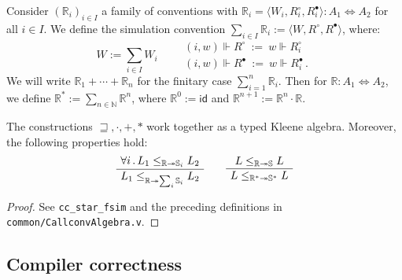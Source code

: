 \documentclass[acmsmall,screen,review,anonymous]{acmart}
\newcommand{\kw}[1]{\ensuremath{ \mathsf{#1} }}
\newcommand{\que}{\circ}
\newcommand{\ans}{\bullet}
\newcommand{\scref}{\sqsupseteq}
\begin{document}
\begin{definition} \label{def:joins} %
Consider $(\mathbb{R}_i)_{i \in I}$
a family of conventions
with
$\mathbb{R}_i = \langle W_i, R_i^\que, R_i^\ans \rangle
  : A_1 \Leftrightarrow A_2$
for all $i \in I$.
We define the simulation convention
$\sum_{i \in I} \mathbb{R}_i := \langle W, R^\que, R^\ans \rangle$,
where:
\[
  W := \sum_{i \in I} W_i  \qquad
  \begin{array}{l}
  (i, w) \Vdash R^\que \: := \: w \Vdash R_i^\que \\[1ex]
  (i, w) \Vdash R^\ans \: := \: w \Vdash R_i^\ans \,.
  \end{array}
\]
We will write $\mathbb{R}_1 + \cdots + \mathbb{R}_n$
for the finitary case $\sum_{i=1}^n \mathbb{R}_i$.
Then for $\mathbb{R} : A_1 \Leftrightarrow A_2$,
we define
$\mathbb{R}^* := \sum_{n \in \mathbb{N}} \mathbb{R}^n$,
where
$\mathbb{R}^0 := \kw{id}$ and
$\mathbb{R}^{n+1} := \mathbb{R}^n \cdot \mathbb{R}$.
\end{definition}

\begin{theorem} \label{thm:simk} %
The constructions ${\scref}, {\cdot}, {+}, {*}$
work together as a typed Kleene algebra.
Moreover, the following properties hold:
\[
  \AxiomC{$\forall i \,.\,
    L_1 \le_{\mathbb{R} \twoheadrightarrow \mathbb{S}_i} L_2$}
  \UnaryInfC{$
    L_1 \le_{\mathbb{R} \twoheadrightarrow \sum_i \mathbb{S}_i} L_2$}
  \DisplayProof
  \qquad
  \AxiomC{$L \le_{\mathbb{R} \twoheadrightarrow \mathbb{S}} L$}
  \UnaryInfC{$L \le_{\mathbb{R}^* \twoheadrightarrow \mathbb{S}^*} L$}
  \DisplayProof
\]
\begin{proof}
See \texttt{cc\_star\_fsim} and the preceding definitions
in \texttt{common/CallconvAlgebra.v}.
\end{proof}
\end{theorem}


\subsection{Compiler correctness} \label{sec:comppass} %
\end{document}
